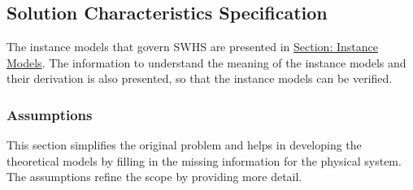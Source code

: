 \documentclass[12pt]{article}
\begin{document}
\subsection{Solution Characteristics Specification}
\label{Sec:SolCharSpec}
The instance models that govern SWHS are presented in \hyperref[Sec:IMs]{Section: Instance Models}. The information to understand the meaning of the instance models and their derivation is also presented, so that the instance models can be verified.

\subsubsection{Assumptions}
\label{Sec:Assumps}
This section simplifies the original problem and helps in developing the theoretical models by filling in the missing information for the physical system. The assumptions refine the scope by providing more detail.
\end{document}

